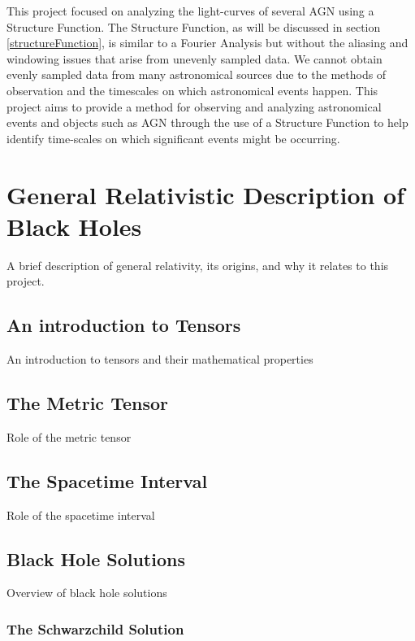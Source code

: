 \documentclass[12pt, oneside]{smuthesis}
\begin{document}
This project focused on analyzing the light-curves of several AGN using a Structure Function. The Structure Function, as will be discussed in section \ref{structureFunction}, is similar to a Fourier Analysis but without the aliasing and windowing issues that arise from unevenly sampled data. We cannot obtain evenly sampled data from many astronomical sources due to the methods of observation and the timescales on which astronomical events happen. This project aims to provide a method for observing and analyzing astronomical events and objects such as AGN through the use of a Structure Function to help identify time-scales on which significant events might be occurring.

\chapter{\sc General Relativistic Description of Black Holes} \label{generalRelativity}

A brief description of general relativity, its origins, and why it relates to this project.

\section{\sc An introduction to Tensors} \label{tensorIntro}

An introduction to tensors and their mathematical properties

\section{\sc The Metric Tensor} \label{metricTensor}

Role of the metric tensor

\section{\sc The Spacetime Interval} \label{spacetimeInterval}

Role of the spacetime interval

\section{\sc Black Hole Solutions} \label{blackHoleSolutions}

Overview of black hole solutions

\subsection{\sc The Schwarzchild Solution} \label{schwarzchildSolution}
\end{document}
